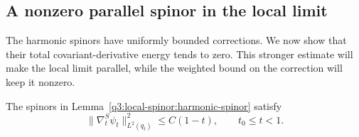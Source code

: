 \subsection{A nonzero parallel spinor in the local limit}

The harmonic spinors have uniformly bounded corrections. We now show
that their total covariant-derivative energy tends to zero. This stronger
estimate will make the local limit parallel, while the weighted bound
on the correction will keep it nonzero.

\begin{lemma}
\label{q3:local-spinor:energy-lemma}
The spinors in Lemma~\ref{q3:local-spinor:harmonic-spinor} satisfy
\begin{equation}\label{q3:local-spinor:small-energy}
 \|\nabla^S_t\psi_t\|_{L^2(q_t)}^2\le C(1-t),
 \qquad t_0\le t<1.
\end{equation}
\end{lemma}

